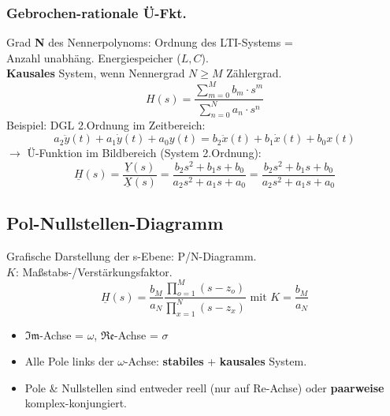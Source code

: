 \subsubsection{Gebrochen-rationale Ü-Fkt.}
\small{Grad \textbf{N} des Nennerpolynoms: Ordnung des LTI-Systems =\\ Anzahl unabhäng. Energiespeicher ($L, C$).\\
\textbf{Kausales} System, wenn Nennergrad $N\ge M$ Z\"ahlergrad}.
\[
H(s)=\frac{\sum_{m=0}^{M} b_{m} \cdot s^{m}}{\sum_{n=0}^{N} a_{n} \cdot s^{n}}
\]
Beispiel: DGL 2.Ordnung im Zeitbereich:
\[
a_2\ddot{y}(t)+a_1\dot{y}(t)+a_0 y(t)=b_2\ddot{x}(t)+b_1\dot{x}(t)+b_0 x(t)
\]
$\rightarrow$ Ü-Funktion im Bildbereich (System 2.Ordnung):
\[
\underline{H}(s)=\frac{\underline{Y}(s)}{\underline{X}(s)}=\frac{b_2 s^2+b_1 s+b_0}{a_2 s^2 +a_1 s +a_0}
=\frac{b_2 s^2+b_1 s+b_0}{a_2 s^2 +a_1 s +a_0}
\]
\subsection{Pol-Nullstellen-Diagramm}
\small{Grafische Darstellung der s-Ebene: P/N-Diagramm.\\
$K$: Maßstabs-/Verstärkungsfaktor.}
	\[
	 \underline{H}(s) =\frac{b_M}{a_N} \frac{\prod_{o=1}^{M} (s-z_o)}{\prod_{x=1}^{N} (s-z_x)} \text{ mit } K=\frac{b_M}{a_N}
	\]
\begin{itemize}
\item $\mathfrak{Im}$-Achse = $\omega$, \quad $\mathfrak{Re}$-Achse = $\sigma$
\item Alle Pole links der $\omega$-Achse: \textbf{stabiles} + \textbf{kausales} System.
\item Pole \& Nullstellen sind entweder reell (nur auf Re-Achse) oder \textbf{paarweise} komplex-konjungiert.
\end{itemize}
